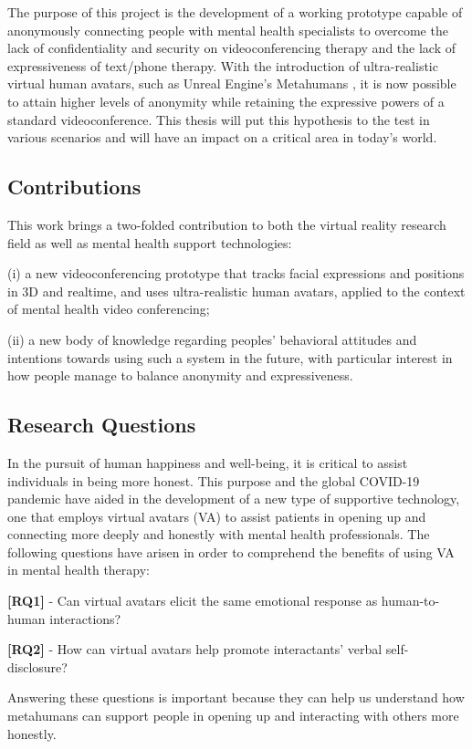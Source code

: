 The purpose of this project is the development of a working prototype capable of anonymously connecting people with mental health specialists to overcome the lack of confidentiality and security on videoconferencing therapy and the lack of expressiveness of text/phone therapy. With the introduction of ultra-realistic virtual human avatars, such as Unreal Engine's Metahumans \cite{EPI21, FAN21}, it is now possible to attain higher levels of anonymity while retaining the expressive powers of a standard videoconference. This thesis will put this hypothesis to the test in various scenarios and will have an impact on a critical area in today's world.

\subsection{Contributions}
This work brings a two-folded contribution to both the virtual reality research field as well as mental health support technologies:

(i) a new videoconferencing prototype that tracks facial expressions and positions in 3D and realtime, and uses ultra-realistic human avatars, applied to the context of mental health video conferencing;

(ii) a new body of knowledge regarding peoples’ behavioral attitudes and intentions towards using such a system in the future, with particular interest in how people manage to balance anonymity and expressiveness.

\subsection{Research Questions}
In the pursuit of human happiness and well-being, it is critical to assist individuals in being more honest. This purpose and the global COVID-19 pandemic have aided in the development of a new type of supportive technology, one that employs virtual avatars (VA) to assist patients in opening up and connecting more deeply and honestly with mental health professionals. The following questions have arisen in order to comprehend the benefits of using VA in mental health therapy:

\textbf{[RQ1]} - Can virtual avatars elicit the same emotional response as human-to-human interactions?

\textbf{[RQ2]} - How can virtual avatars help promote interactants' verbal self-disclosure?

Answering these questions is important because they can help us understand how metahumans can support people in opening up and interacting with others more honestly. 

